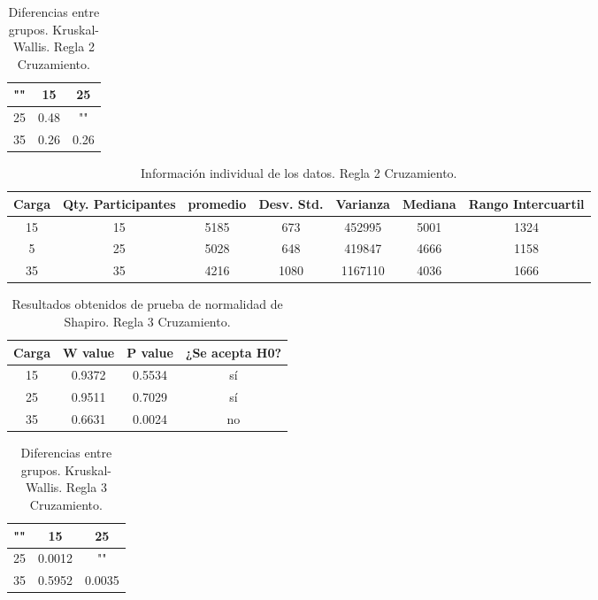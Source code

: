\documentclass{article}
\begin{document}
\begin{table}[htb]
    \centering
    \caption{Diferencias entre grupos. Kruskal-Wallis. Regla 2 Cruzamiento.} 
    \begin{tabular}{|c|c|c|}
    \hline
    "" & 15 & 25 \\
    \hline
    25 & 0.48 & ""  \\
    \hline
    35 & 0.26 & 0.26  \\
    \hline
\end{tabular}
    \label{cuadro 5}
\end{table}

\begin{table}[htb]
    \centering
    \caption{Informaci\'on individual de los datos. Regla 2 Cruzamiento.} 
    \begin{tabular}{|c|c|c|c|c|c|c|}
    \hline
    Carga & Qty. Participantes & promedio & Desv. Std. & Varianza & Mediana & Rango Intercuartil  \\
    \hline
    15 & 15 & 5185 & 673 & 452995 & 5001 & 1324 \\
    \hline
    5 & 25 & 5028 & 648 & 419847 & 4666 & 1158 \\
    \hline
    35 & 35 & 4216 & 1080 & 1167110 & 4036 & 1666 \\
    \hline
\end{tabular}
    \label{cuadro 6}
\end{table}



\begin{table}[ht]
    \centering
    \caption{Resultados obtenidos de prueba de normalidad de Shapiro. Regla 3 Cruzamiento.} 
    \begin{tabular}{|c|c|c|c|}
    \hline
    Carga & W value & P value & ¿Se acepta H0?  \\
    \hline
    15 & 0.9372 & 0.5534 & s\'i \\
    \hline 
     25 & 0.9511 & 0.7029 &  s\'i \\
    \hline 
    35 & 0.6631 & 0.0024 & no \\
    \hline 
\end{tabular}
    \label{cuadro 7}
\end{table}

\begin{table}[htb]
    \centering
    \caption{Diferencias entre grupos. Kruskal-Wallis. Regla 3 Cruzamiento.} 
    \begin{tabular}{|c|c|c|}
    \hline
    "" & 15 & 25 \\
    \hline
    25 & 0.0012 & ""  \\
    \hline
    35 & 0.5952 & 0.0035  \\
    \hline
\end{tabular}
    \label{cuadro 8}
\end{table}
\end{document}
